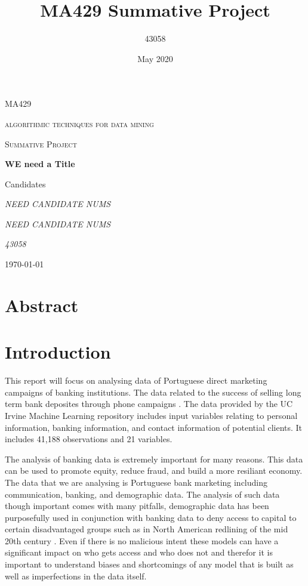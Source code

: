 \documentclass[a4paper, oneside, 11pt]{article}
\title{MA429 Summative Project}
\author{43058}
\date{May 2020}
\begin{document}
\begin{titlepage}
    \centering
    \par\vspace{1cm}
    {\scshape\LARGE MA429\par}
	{\scshape\LARGE algorithmic techniques for data mining\par}
	\vspace{1cm}
	{\scshape\Large Summative Project\par}
	\vspace{1.5cm}
	{\huge\bfseries WE need a Title\par}
    \vspace{2cm}
    {\large Candidates\par}
    {\Large\itshape NEED CANDIDATE NUMS\par}
    {\Large\itshape NEED CANDIDATE NUMS\par}
	{\Large\itshape 43058\par}

	\vfill

	{\large \today\par}
\end{titlepage}
\newpage 
\tableofcontents
\newpage

\newpage 
\section*{Abstract}
\newpage

\section{Introduction}
This report will focus on analysing data of Portuguese direct marketing campaigns of banking institutions. The data related to the success of selling long term bank deposites through phone campaigns \cite{moro_data-driven_2014}. The data provided by the UC Irvine Machine Learning repository includes input variables relating to personal information, banking information, and contact information of potential clients. It includes 41,188 observations and 21 variables.

The analysis of banking data is extremely important for many reasons. This data can be used to promote equity, reduce fraud, and build a more resiliant economy. The data that we are analysing is Portuguese bank marketing including communication, banking, and demographic data. The analysis of such data though important comes with many pitfalls, demographic data has been purposefully used in conjunction with banking data to deny access to capital to certain disadvantaged groups such as in North American redlining of the mid 20th century \cite{harris_suburban_2003}. Even if there is no malicious intent these models can have a significant impact on who gets access and who does not and therefor it is important to understand biases and shortcomings of any model that is built as well as imperfections in the data itself.
\end{document}
